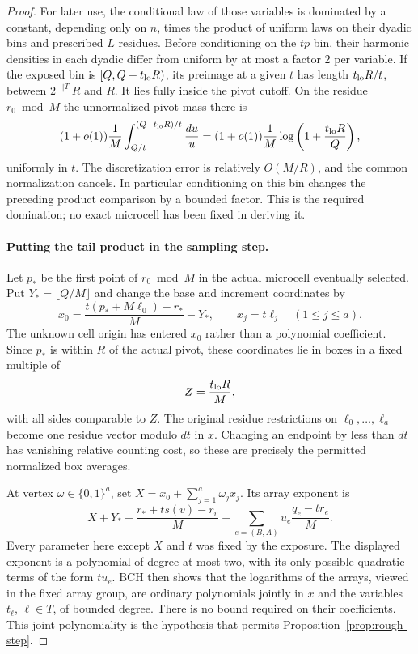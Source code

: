 \begin{proof}
For later use, the conditional law of those variables is dominated
by a constant, depending only on $n$, times the product of uniform
laws on their dyadic bins and prescribed $L$ residues.  Before
conditioning on the $tp$ bin, their harmonic densities in each
dyadic differ from uniform by at most a factor $2$ per variable.
If the exposed bin is $[Q,Q+t_{\rm lo}R)$, its preimage at a given
$t$ has length $t_{\rm lo}R/t$, between $2^{-|T|}R$ and $R$.
It lies fully inside the pivot cutoff.  On the residue $r_0\bmod M$
the unnormalized pivot mass there is
\[
 (1+o(1))\frac1M\int_{Q/t}^{(Q+t_{\rm lo}R)/t}\frac{du}{u}
 = (1+o(1))\frac1M\log\left(1+\frac{t_{\rm lo}R}{Q}\right),
\]
uniformly in $t$.  The discretization error is relatively
$O(M/R)$, and the common normalization cancels.  In particular
conditioning on this bin changes the preceding product comparison
by a bounded factor.  This is the required domination; no exact
microcell has been fixed in deriving it.

\paragraph{Putting the tail product in the sampling step.}
Let $p_*$ be the first point of $r_0\bmod M$ in the actual
microcell eventually selected.  Put $Y_*=\lfloor Q/M\rfloor$ and
change the base and increment coordinates by
\begin{equation}\label{eq:alignment-cube-coordinates}
 x_0=\frac{t(p_*+M\ell_0)-r_*}{M}-Y_*,
 \qquad x_j=t\ell_j\quad(1\le j\le a).
\end{equation}
The unknown cell origin has entered $x_0$ rather than a polynomial
coefficient.  Since $p_*$ is within $R$ of the actual pivot, these
coordinates lie in boxes in a fixed multiple of
\[
 Z=\frac{t_{\rm lo}R}{M},
\]
with all sides comparable to $Z$.  The original residue restrictions
on $\ell_0,\ldots,\ell_a$ become one residue vector modulo $dt$ in $x$.
Changing an endpoint by less than $dt$ has vanishing relative
counting cost, so these are precisely the permitted normalized
box averages.

At vertex $\omega\in\{0,1\}^a$, set
$X=x_0+\sum_{j=1}^a\omega_jx_j$.  Its array exponent is
\begin{equation}\label{eq:alignment-joint-polynomial-exponent}
 X+Y_*+\frac{r_*+t s(v)-r_v}{M}
       +\sum_{e=(B,A)}u_e\frac{q_e-tr_e}{M}.
\end{equation}
Every parameter here except $X$ and $t$ was fixed by the exposure.
The displayed exponent is a polynomial of degree at most two,
with its only possible quadratic terms of the form $tu_e$.
BCH then shows that the logarithms of the arrays,
viewed in the fixed array group, are ordinary polynomials jointly
in $x$ and the variables $t_\ell$, $\ell\in T$, of bounded degree.
There is no bound required on their coefficients.  This joint
polynomiality is the hypothesis that permits Proposition~\ref{prop:rough-step}.


\end{proof}
